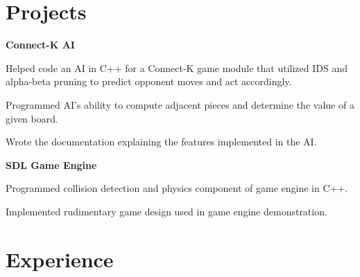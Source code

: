 \documentclass[10pt, letterpaper, sans]{moderncv} %
\begin{document}
\section{Projects}
\textbf{Connect-K AI}
\begin{itemize}
{
\item Helped code an AI in C++ for a Connect-K game module that utilized IDS and alpha-beta pruning to predict opponent moves and act accordingly.
\item Programmed AI's ability to compute adjacent pieces and determine the value of a given board.
\item Wrote the documentation explaining the features implemented in the AI.
}
\end{itemize}

\textbf{SDL Game Engine}
\begin{itemize}
{
\item Programmed collision detection and physics component of game engine in C++.
\item Implemented rudimentary game design used in game engine demonstration.
}

\end{itemize}

\section{Experience}

\end{document}
